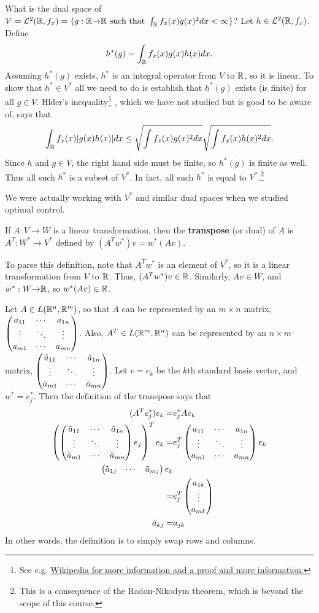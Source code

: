 \begin{example}
  What is the dual space of $V = \mathcal{L}^2(\mathbb{R},f_x) = \{g:
  \mathbb{R} {\rightarrow} \mathbb{R} \text{ such that } \int_{\mathbb{R}} f_x(x) g(x)^2 dx <
  \infty\}$? Let $h \in \mathcal{L}^2(\mathbb{R},f_x)$. Define 
  \[ h^\ast(g) = \int_{\mathbb{R}} f_x(x) g(x) h(x) dx. \] 
  Assuming $h^\ast(g)$
  exists, $h^\ast$ is an integral operator from $V$ to $\mathbb{R}$, so it is
  linear. To show that $h^\ast \in V^\ast$ all we need to do is
  establish that $h^\ast(g)$ exists (is finite) for all $g \in V$. 
  Hlder's inequality\footnote{See
    e.g.
    \href{http://en.wikipedia.org/wiki/H\%C3\%B6lder\%27s_inequality}
      {Wikipedia for more information and a proof and more
        information.}} , which we have not studied but is good to be
    aware of, says that
  \[ \int_{\mathbb{R}} f_x(x) |g(x) h(x)| dx \leq \sqrt{\int f_x(x) g(x)^2 dx}
  \sqrt{\int f_x(x) h(x)^2 dx}. \]
  Since $h$ and $g \in V$, the right hand side must be finite, so
  $h^\ast(g)$ is finite as well. Thus all such $h^\ast$ is a subset of
  $V^\ast$.   In fact, all such $h^\ast$ is equal to
  $V^\ast$.\footnote{This is a consequence of the Radon-Nikodym
    theorem, which is beyond the scope of this course.}
 
  We were actually working with $V^\ast$ and similar dual spaces when
  we studied optimal control.
\end{example}

\begin{definition}
  If $A: V \to W$ is a linear transformation, then the
  \textbf{transpose} (or dual) of $A$ is $A^T: W^\ast \to V^\ast$
  defined by $(A^Tw^\ast)v = w^\ast(Av)$.
\end{definition}
To parse this definition, note that $A^T w^\ast$ is an element of
$V^\ast$, so it is a linear transformation from $V$ to $\mathbb{R}$. Thus,
$(A^T w^\ast) v \in \mathbb{R}$. Similarly, $Av \in W$, and $w^\ast: W {\rightarrow}
\mathbb{R}$, so $w^\ast (A v) \in \mathbb{R}$. 
\begin{example}
  Let $A \in L(\mathbb{R}^n, \mathbb{R}^m)$, so that $A$ can be represented by an $m
  \times n$ matrix, $\begin{pmatrix} {a}_{11} & \cdots & {a}_{1n} \\ \vdots & \ddots & \vdots \\ {a}_{m1} & \cdots & {a}_{mn} \end{pmatrix}$. Also, $A^T \in L(\mathbb{R}^m, \mathbb{R}^n)$ can
  be represented by an $n \times m$ matrix, $\begin{pmatrix} {\tilde{a}}_{11} & \cdots & {\tilde{a}}_{1n} \\ \vdots & \ddots & \vdots \\ {\tilde{a}}_{m1} & \cdots & {\tilde{a}}_{mn} \end{pmatrix}$. Let
  $v = e_k$ be the $k$th standard basis vector, and $w^\ast =
  e_j^\ast$. Then the definition of the transpose says that
  \begin{align*}
    (A^T e_j^\ast) e_k = & e_j^\ast A e_k  \\
    \left(\begin{pmatrix} {\tilde{a}}_{11} & \cdots & {\tilde{a}}_{1n} \\ \vdots & \ddots & \vdots \\ {\tilde{a}}_{m1} & \cdots & {\tilde{a}}_{mn} \end{pmatrix} e_j\right)^T e_k = & e_j^T \begin{pmatrix} {a}_{11} & \cdots & {a}_{1n} \\ \vdots & \ddots & \vdots \\ {a}_{m1} & \cdots & {a}_{mn} \end{pmatrix}
    e_k \\
    \begin{pmatrix} \tilde{a}_{1j} & \cdots &  \tilde{a}_{mj}
    \end{pmatrix} e_k \\ = & e_j^T \begin{pmatrix} a_{1k} \\ \vdots \\  a_{mk}
    \end{pmatrix} \\
    \tilde{a}_{kj} = & a_{jk}
  \end{align*}
  In other words, the definition is to simply swap rows and columns.  
\end{example}

